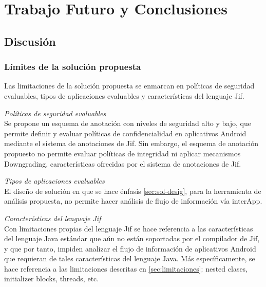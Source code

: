 \label{ch:trabajoFuturo}
\chapter{Trabajo Futuro y Conclusiones}
\section{Discusión}
\subsection{Límites de la solución propuesta}
Las limitaciones de la solución propuesta se enmarcan en políticas de seguridad
evaluables, tipos de aplicaciones evaluables y características del lenguaje Jif.

\emph{Políticas de seguridad evaluables}\\
Se propone un esquema de anotación con niveles de seguridad alto y
bajo, que permite definir y evaluar políticas de confidencialidad en aplicativos
Android mediante el sistema de anotaciones de Jif.
Sin embargo, el esquema de anotación propuesto no permite evaluar políticas de
integridad ni aplicar mecanismos Downgrading, características ofrecidas por el
sistema de anotaciones de Jif.

\emph{Tipos de aplicaciones evaluables}\\
El diseño de solución en que se hace énfasis \ref{sec:sol-desig}, para la
herramienta de análisis propuesta, no permite hacer análisis de flujo de
información vía interApp. 

\emph{Características del lenguaje Jif}\\
Con limitaciones propias del lenguaje Jif se hace referencia a las
características del lenguaje Java estándar que aún no están soportadas por el
compilador de Jif, y que por tanto, impiden analizar el flujo de información de
aplicativos Android que requieran de tales características del lenguaje Java.
Más específicamente, se hace referencia a las limitaciones descritas en
\ref{sec:limitaciones}: nested clases, initializer blocks, threads, etc.

